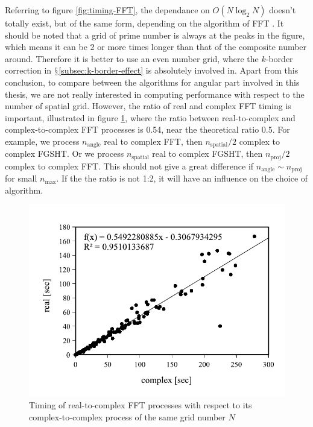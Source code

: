 Referring to figure \ref{fig:timing-FFT}, the dependance on $O(N\log_{2}N)$
\citep{Numerical_Recipes_3ed} doesn't totally exist, but of the same
form, depending on the algorithm of \acs{FFT} \citep{Briggs-DFT}.
It should be noted that a grid of prime number is always at the peaks
in the figure, which means it can be 2 or more times longer than that
of the composite number around. Therefore it is better to use an even
number grid, where the $k$-border correction in $\mathsection$\ref{subsec:k-border-effect}
is absolutely involved in. Apart from this conclusion, to compare
between the algorithms for angular part involved in this thesis, we
are not really interested in computing performance with respect to
the number of spatial grid. However, the ratio of real and complex
\acs{FFT} timing is important, illustrated in figure \ref{fig:fft-real-to-complex},
where the ratio between real-to-complex and complex-to-complex \acs{FFT}
processes is 0.54, near the theoretical ratio 0.5. For example, we
process $n_{\mathrm{angle}}$ real to complex \acs{FFT}, then $n_{\mathrm{spatial}}/2$
complex to complex \acs{FGSHT}. Or we process $n_{\mathrm{spatial}}$
real to complex \acs{FGSHT}, then $n_{\mathrm{proj}}/2$ complex
to complex \acs{FFT}. This should not give a great difference if
$n_{\mathrm{angle}}\sim n_{\mathrm{proj}}$ for small $n_{\max}$.
If the the ratio is not 1:2, it will have an influence on the choice
of algorithm.
\begin{center}
\begin{figure}[h]
\begin{centering}
\includegraphics[bb=0bp 20bp 340bp 235bp,width=0.5\columnwidth]{_figure/results/fftw_real_v_cmplx}
\par\end{centering}
\caption{Timing of real-to-complex \acs{FFT} processes with respect to its
complex-to-complex process of the same grid number $N$\label{fig:fft-real-to-complex}}
\end{figure}
\par\end{center}

